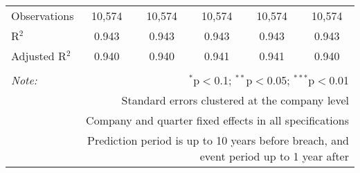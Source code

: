 \begin{table}[!htbp]
\begin{tabular}{@{\extracolsep{5pt}}lccccc}
Observations & 10,574 & 10,574 & 10,574 & 10,574 & 10,574 \\ 
R$^{2}$ & 0.943 & 0.943 & 0.943 & 0.943 & 0.943 \\ 
Adjusted R$^{2}$ & 0.940 & 0.940 & 0.941 & 0.941 & 0.940 \\ 
\hline 
\hline \\[-1.8ex] 
\textit{Note:}  & \multicolumn{5}{r}{$^{*}$p$<$0.1; $^{**}$p$<$0.05; $^{***}$p$<$0.01} \\ 
 & \multicolumn{5}{r}{Standard errors clustered at the company level} \\ 
 & \multicolumn{5}{r}{Company and quarter fixed effects in all specifications} \\ 
 & \multicolumn{5}{r}{Prediction period is up to 10 years before breach, and event period up to 1 year after} \\ 
\end{tabular} 
\end{table} 
